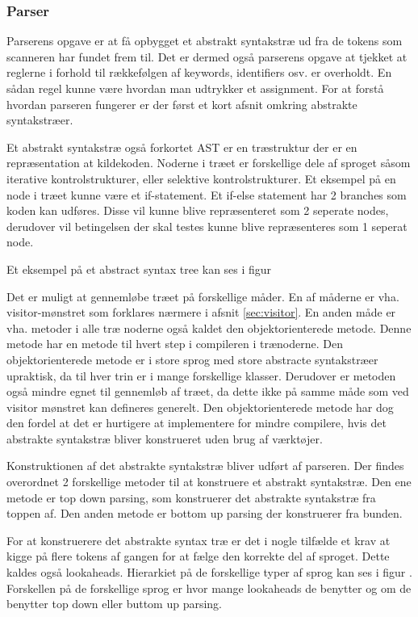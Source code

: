 \subsubsection{Parser}\wip
Parserens opgave er at få opbygget et abstrakt syntakstræ ud fra de tokens som scanneren har fundet frem til. Det er dermed også parserens opgave at tjekket at reglerne i forhold til rækkefølgen af keywords, identifiers osv. er overholdt. En sådan regel kunne være hvordan man udtrykker et assignment. For at forstå hvordan parseren fungerer er der først et kort afsnit omkring abstrakte syntakstræer.

Et abstrakt syntakstræ også forkortet AST er en træstruktur der er en repræsentation at kildekoden. Noderne i træet er forskellige dele af sproget såsom iterative kontrolstrukturer, eller selektive kontrolstrukturer. Et eksempel på en node i træet kunne være et if-statement. Et if-else statement har 2 branches som koden kan udføres. Disse vil kunne blive repræsenteret som 2 seperate nodes, derudover vil betingelsen der skal testes kunne blive repræsenteres som 1 seperat node.

Et eksempel på et abstract syntax tree kan ses i figur

Det er muligt at gennemløbe træet på forskellige måder. En af måderne er vha. visitor-mønstret som forklares nærmere i afsnit \ref{sec:visitor}. En anden måde er vha. metoder i alle træ noderne også kaldet den objektorienterede metode. Denne metode har en metode til hvert step i compileren i trænoderne. Den objektorienterede metode er i store sprog med  store abstracte syntakstræer upraktisk, da til hver trin er i mange forskellige klasser. Derudover er metoden også mindre egnet til gennemløb af træet, da dette ikke på samme måde som ved visitor mønstret kan defineres generelt. Den objektorienterede metode har dog den fordel at det er hurtigere at implementere for mindre compilere, hvis det abstrakte syntakstræ bliver konstrueret uden brug af værktøjer.

Konstruktionen af det abstrakte syntakstræ bliver udført af parseren. Der findes overordnet 2 forskellige metoder til at konstruere et abstrakt syntakstræ. Den ene metode er top down parsing, som konstruerer det abstrakte syntakstræ fra toppen af. Den anden metode er bottom up parsing der konstruerer fra bunden.

For at konstruerere det abstrakte syntax træ er det i nogle tilfælde et krav at kigge på flere tokens af gangen for at fælge den korrekte del af sproget. Dette kaldes også lookaheads. Hierarkiet på de forskellige typer af sprog kan ses i figur . Forskellen på de forskellige sprog er hvor mange lookaheads de benytter og om de benytter top down eller buttom up parsing.


